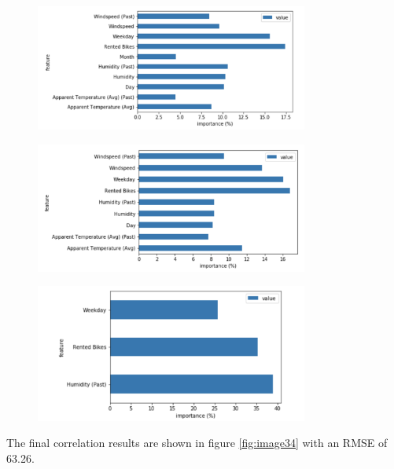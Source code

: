 \begin{figure}[H]
\centering
\includegraphics[width=0.8\textwidth]{media/test3_gb}\label{fig:test3_gb}
\label{fig:test3_gb}
\end{figure}
\begin{figure}[H]
\centering
\includegraphics[width=0.8\textwidth]{media/test4_gb}\label{fig:test4_gb}
\label{fig:test4_gb}
\end{figure}
\begin{figure}[H]
\centering
\includegraphics[width=0.8\textwidth]{media/test5_gb}\label{fig:test5_gb}
\label{fig:test5_gb}
\end{figure}
The final correlation results are shown in figure \ref{fig:image34} with an RMSE of 63.26.
